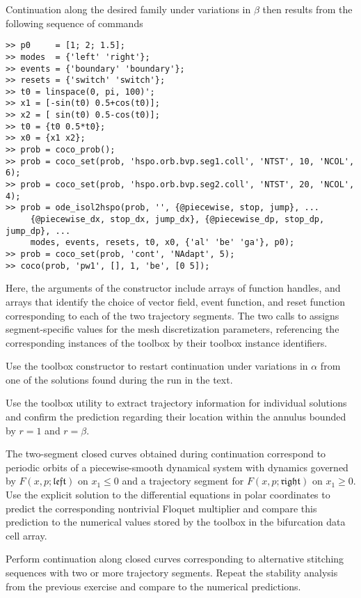 Continuation along the desired family under variations in $\beta$ then results from the following sequence of commands
\begin{lstlisting}[language=coco-highlight]
>> p0     = [1; 2; 1.5];
>> modes  = {'left' 'right'};
>> events = {'boundary' 'boundary'};
>> resets = {'switch' 'switch'};
>> t0 = linspace(0, pi, 100)';
>> x1 = [-sin(t0) 0.5+cos(t0)];
>> x2 = [ sin(t0) 0.5-cos(t0)];
>> t0 = {t0 0.5*t0};
>> x0 = {x1 x2};
>> prob = coco_prob();
>> prob = coco_set(prob, 'hspo.orb.bvp.seg1.coll', 'NTST', 10, 'NCOL', 6);
>> prob = coco_set(prob, 'hspo.orb.bvp.seg2.coll', 'NTST', 20, 'NCOL', 4);
>> prob = ode_isol2hspo(prob, '', {@piecewise, stop, jump}, ...
     {@piecewise_dx, stop_dx, jump_dx}, {@piecewise_dp, stop_dp, jump_dp}, ...
     modes, events, resets, t0, x0, {'al' 'be' 'ga'}, p0);
>> prob = coco_set(prob, 'cont', 'NAdapt', 5);
>> coco(prob, 'pw1', [], 1, 'be', [0 5]);
\end{lstlisting}
Here, the arguments of the  constructor include arrays of function handles, and arrays that identify the choice of vector field, event function, and reset function corresponding to each of the two trajectory segments. The two calls to  assigns segment-specific values for the mesh discretization parameters, referencing the corresponding instances of the  toolbox by their toolbox instance identifiers.\\
\medskip

\begin{exercises}

\item Use the  toolbox constructor to restart continuation under variations in $\alpha$ from one of the solutions found during the  run in the text.

\item Use the  toolbox utility to extract trajectory information for individual solutions and confirm the prediction regarding their location within the annulus bounded by $r=1$ and $r=\beta$.

\item The two-segment closed curves obtained during continuation correspond to periodic orbits of a piecewise-smooth dynamical system with dynamics governed by $F(x,p;\mathfrak{left})$ on $x_1\le 0$ and a trajectory segment for $F(x,p;\mathfrak{right})$ on $x_1\ge 0$. Use the explicit solution to the differential equations in polar coordinates to predict the corresponding nontrivial Floquet multiplier and compare this prediction to the numerical values stored by the  toolbox in the bifurcation data cell array.

\item Perform continuation along closed curves corresponding to alternative stitching sequences with two or more trajectory segments. Repeat the stability analysis from the previous exercise and compare to the numerical predictions.

\end{exercises}

